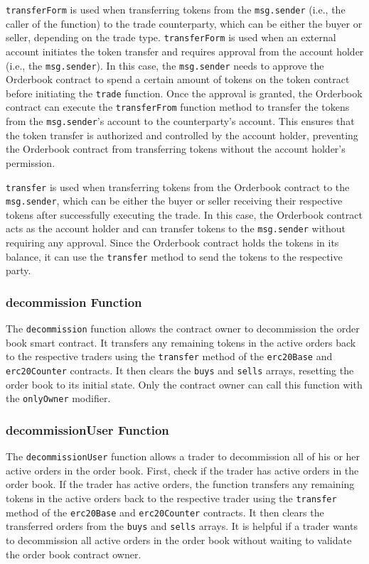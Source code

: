 \texttt{transferForm} is used when transferring tokens from the \texttt{msg.sender} (i.e.,
the caller of the function) to the trade counterparty, which can be either the buyer or seller, depending on the trade type.
\texttt{transferForm} is used when an external account initiates the token transfer and requires approval from
the account holder (i.e., the \texttt{msg.sender}). In this case, the \texttt{msg.sender} needs to approve the Orderbook contract to spend a certain amount of tokens
on the token contract before initiating the \texttt{trade} function. Once the approval is granted, the Orderbook contract can execute the \texttt{transferFrom} function
method to transfer the tokens from the \texttt{msg.sender}'s account to the counterparty's account. This ensures that the token transfer is authorized and
controlled by the account holder, preventing the Orderbook contract from transferring tokens without the account holder's permission.


\texttt{transfer} is used when transferring tokens from the Orderbook contract to the \texttt{msg.sender}, which can be either the buyer or seller receiving
their respective tokens after successfully executing the trade. In this case, the Orderbook contract acts as the account holder and can transfer tokens to the
\texttt{msg.sender} without requiring any approval. Since the Orderbook contract holds the tokens in its balance, it can use the \texttt{transfer} method to
send the tokens to the respective party.

\subsubsection{decommission Function}


The \texttt{decommission} function allows the contract owner to decommission the order book smart contract. It transfers any remaining tokens in the active
orders back to the respective traders using the \texttt{transfer} method of the \texttt{erc20Base} and \texttt{erc20Counter} contracts. It then clears
the \texttt{buys} and \texttt{sells} arrays, resetting the order book to its initial state. Only the contract owner can call this function with the
\texttt{onlyOwner} modifier.


\subsubsection{decommissionUser Function}


The \texttt{decommissionUser} function allows a trader to decommission all of his or her active orders in the order book. First, check if the trader has active orders in the order book.
If the trader has active orders, the function transfers any remaining tokens in the active orders back to the respective trader using the \texttt{transfer} method
of the \texttt{erc20Base} and \texttt{erc20Counter} contracts. It then clears the transferred orders from the \texttt{buys} and \texttt{sells} arrays. It is helpful
if a trader wants to decommission all active orders in the order book without waiting to validate the order book contract owner.


